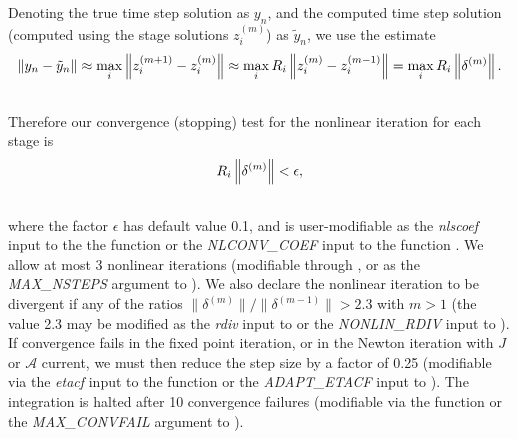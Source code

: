 \documentclass[letterpaper,10pt,english]{sphinxmanual}
\begin{document}
Denoting the true time step solution as $y_n$, and the computed
time step solution (computed using the stage solutions
$z_i^{(m)}$) as $\tilde{y}_n$, we use the estimate
\begin{gather}
\begin{split}\left\| y_n - \tilde{y}_n \right\| \approx
\max_i \left\| z_i^{(m+1)} - z_i^{(m)} \right\| \approx
\max_i R_i \left\| z_i^{(m)} - z_i^{(m-1)} \right\| =
\max_i R_i \left\| \delta^{(m)} \right\|.\end{split}\notag\\\begin{split}\end{split}\notag
\end{gather}
Therefore our convergence (stopping) test for the nonlinear iteration
for each stage is
\begin{gather}
\begin{split}R_i \left\|\delta^{(m)} \right\| < \epsilon,\end{split}\notag\\\begin{split}\end{split}\notag
\end{gather}
where the factor $\epsilon$ has default value 0.1, and is
user-modifiable as the \emph{nlscoef} input to the the function
{\hyperref[c_interface/User_callable:ARKodeSetNonlinConvCoef]{}} or the \emph{NLCONV\_COEF} input to the
function {\hyperref[f_interface/Usage:f/_/FARKSETRIN]{}}.  We allow at most 3 nonlinear
iterations (modifiable through {\hyperref[c_interface/User_callable:ARKodeSetMaxNonlinIters]{}}, or
as the \emph{MAX\_NSTEPS} argument to {\hyperref[f_interface/Usage:f/_/FARKSETIIN]{}}).  We also
declare the nonlinear iteration to be divergent if any of the ratios
$\|\delta^{(m)}\| / \|\delta^{(m-1)}\| > 2.3$ with $m>1$
(the value 2.3 may be modified as the \emph{rdiv} input to
{\hyperref[c_interface/User_callable:ARKodeSetNonlinRDiv]{}} or the \emph{NONLIN\_RDIV} input to
{\hyperref[f_interface/Usage:f/_/FARKSETRIN]{}}).  If convergence fails in the fixed
point iteration, or in the Newton iteration with $J$ or
${\mathcal A}$ current, we must then reduce the step size by a
factor of 0.25 (modifiable via the \emph{etacf} input to the
{\hyperref[c_interface/User_callable:ARKodeSetMaxCFailGrowth]{}} function or the \emph{ADAPT\_ETACF}
input to {\hyperref[f_interface/Usage:f/_/FARKSETRIN]{}}).  The integration is halted after 10
convergence failures (modifiable via the
{\hyperref[c_interface/User_callable:ARKodeSetMaxConvFails]{}} function or the \emph{MAX\_CONVFAIL}
argument to {\hyperref[f_interface/Usage:f/_/FARKSETIIN]{}}).
\end{document}
